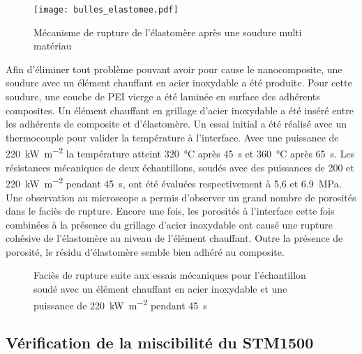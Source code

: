 \begin{figure}[h]
	\centering
	\texttt{[image: bulles\_elastomee.pdf]}
	\caption{Mécanisme de rupture de l'élastomère après une soudure multi matériau}
	\label{fig:bulles_elastomere}
\end{figure}

Afin d'éliminer tout problème pouvant avoir pour cause le nanocomposite, une soudure avec un élément chauffant en acier inoxydable a été produite. 
Pour cette soudure, une couche de PEI vierge a été laminée en surface des adhérents composites.
Un élément chauffant en grillage d'acier inoxydable a été inséré entre les adhérents de composite et d'élastomère. 
Un essai initial a été réalisé avec un thermocouple pour valider la température à l'interface. 
Avec une puissance de \SI{220}{\kilo\watt\per\square\metre} la température atteint \SI{320}{\celsius} après \SI{45}{\second} et \SI{360}{\celsius} après \SI{65}{\second}. 
Les résistances mécaniques de deux échantillons, soudés avec des puissances de 200 et \SI{220}{\kilo\watt\per\square\metre} pendant \SI{45}{\second}, ont été évaluées respectivement à 5,6 et \SI{6,9}{\mega\pascal}. 
Une observation au microscope a permis d'observer un grand nombre de porosités dans le faciès de rupture. 
Encore une fois, les porosités à l'interface cette fois combinées à la présence du grillage d'acier inoxydable ont causé une rupture cohésive de l'élastomère au niveau de l'élément chauffant. 
Outre la présence de porosité, le résidu d'élastomère semble bien adhéré au composite.  

\begin{figure}[h]
	\centering
	 \qquad
	\caption{Faciès de rupture suite aux essais mécaniques pour l'échantillon soudé avec un élément chauffant en acier inoxydable et une puissance de \SI{220}{\kilo\watt\per\square\metre} pendant \SI{45}{\second}}
	\label{fig:STM1500_facies_soudure_SS}
\end{figure}

\subsection{Vérification de la miscibilité du STM1500}

